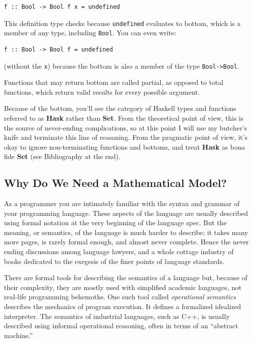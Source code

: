 \begin{verbatim}
f :: Bool -> Bool f x = undefined
\end{verbatim}

This definition type checks because \texttt{undefined} evaluates to
bottom, which is a member of any type, including \texttt{Bool}. You can
even write:

\begin{verbatim}
f :: Bool -> Bool f = undefined
\end{verbatim}

(without the \texttt{x}) because the bottom is also a member of the type
\texttt{Bool-\textgreater{}Bool}.

Functions that may return bottom are called partial, as opposed to total
functions, which return valid results for every possible argument.

Because of the bottom, you'll see the category of Haskell types and
functions referred to as \textbf{Hask} rather than \textbf{Set}. From
the theoretical point of view, this is the source of never-ending
complications, so at this point I will use my butcher's knife and
terminate this line of reasoning. From the pragmatic point of view, it's
okay to ignore non-terminating functions and bottoms, and treat
\textbf{Hask} as bona fide \textbf{Set} (see Bibliography at the end).

\subsection{Why Do We Need a Mathematical
Model?}\label{why-do-we-need-a-mathematical-model}

As a programmer you are intimately familiar with the syntax and grammar
of your programming language. These aspects of the language are usually
described using formal notation at the very beginning of the language
spec. But the meaning, or semantics, of the language is much harder to
describe; it takes many more pages, is rarely formal enough, and almost
never complete. Hence the never ending discussions among language
lawyers, and a whole cottage industry of books dedicated to the exegesis
of the finer points of language standards.

There are formal tools for describing the semantics of a language but,
because of their complexity, they are mostly used with simplified
academic languages, not real-life programming behemoths. One such tool
called \emph{operational semantics} describes the mechanics of program
execution. It defines a formalized idealized interpreter. The semantics
of industrial languages, such as C++, is usually described using
informal operational reasoning, often in terms of an ``abstract
machine.''

